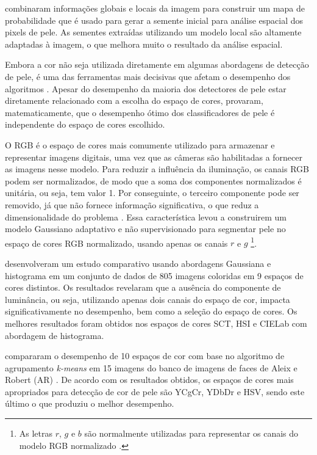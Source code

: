 \citet{kawulok:13} combinaram informações globais e locais da imagem para construir um mapa de probabilidade que é usado para gerar a semente inicial para análise espacial dos pixels de pele. As sementes extraídas utilizando um modelo local são altamente adaptadas à imagem, o que melhora muito o resultado da análise espacial.

Embora a cor não seja utilizada diretamente em algumas abordagens de detecção de pele, é uma das ferramentas mais decisivas que afetam o desempenho dos algoritmos \citep{mahmoodi:16}. Apesar do desempenho da maioria dos detectores de pele estar diretamente relacionado com a escolha do espaço de cores, \citet{albiol:01} provaram, matematicamente, que o desempenho ótimo dos classificadores de pele é independente do espaço de cores escolhido.

O RGB é o espaço de cores mais comumente utilizado para armazenar e representar imagens digitais, uma vez que as câmeras são habilitadas a fornecer as imagens nesse modelo. Para reduzir a influência da iluminação, os canais RGB podem ser normalizados, de modo que a soma dos componentes normalizados é unitária, ou seja, tem valor 1. Por conseguinte, o terceiro componente pode ser removido, já que não fornece informação significativa, o que reduz a dimensionalidade do problema \citep{kakumanu:07}. Essa característica levou \citet{bergasa:00} a construirem um modelo Gaussiano adaptativo e não supervisionado para segmentar pele no espaço de cores RGB normalizado, usando apenas os canais $r$ e $g$ \footnote{As letras $r$, $g$ e $b$ são normalmente utilizadas para representar os canais do modelo RGB normalizado \citep{gonzalez:02}.}.

\citet{jayaram:04} desenvolveram um estudo comparativo usando abordagens Gaussiana e histograma em um conjunto de dados de 805 imagens coloridas em 9 espaços de cores distintos. Os resultados revelaram que a ausência do componente de luminância, ou seja, utilizando apenas dois canais do espaço de cor, impacta significativamente no desempenho, bem como a seleção do espaço de cores. Os melhores resultados foram obtidos nos espaços de cores SCT, HSI e CIELab com abordagem de histograma.

\citet{chaves:10} compararam o desempenho de 10 espaços de cor com base no algoritmo de agrupamento \emph{k-means} em 15 imagens do banco de imagens de faces de Aleix e Robert (AR) \citep{ar-face-database:98}. De acordo com os resultados obtidos, os espaços de cores mais apropriados para detecção de cor de pele são YCgCr, YDbDr e HSV, sendo este último o que produziu o melhor desempenho.

